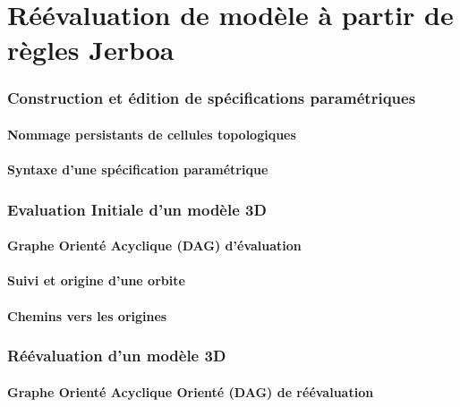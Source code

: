 \part[Réévaluation de modèles à partir de règles Jerboa]{Réévaluation de modèle à partir de règles Jerboa}

\section[Construction et édition de spécifications paramétriques]{Construction et édition de spécifications paramétriques}
\label{sec:constr-edit-spec}

\subsection[Nommage persistant de cellules topologiques]{Nommage persistants de
  cellules topologiques}
\label{sec:nomm-pers-des}

\subsection[Syntaxe d'une spécification paramétrique]{Syntaxe d'une spécification paramétrique}
\label{sec:synt-dune-spec}

\section[Évaluation initiale d'un modèle 3D]{Evaluation Initiale d'un modèle 3D}
\label{sec:eval-init-dun}

\subsection[Graphe Orienté Acyclique (DAG) d'évaluation]{Graphe Orienté Acyclique (DAG) d'évaluation}
\label{sec:dag-eval}

\subsection[Suivi et origine d'une orbite]{Suivi et origine d'une orbite}
\label{sec:suivi-et-origine}

\subsection[Chemins vers les origines]{Chemins vers les origines}
\label{sec:chemins-origines}

\section[Réévaluation d'un modèle 3D]{Réévaluation d'un modèle 3D}
\label{secn:reeval-dun-mod}

\subsection[Graphe Orienté Acyclique (DAG) de réévaluation]{Graphe Orienté Acyclique Orienté (DAG) de réévaluation}
\label{sec:dag-reeval}




